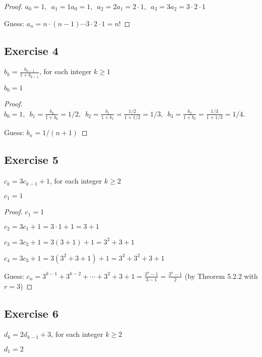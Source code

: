 \documentclass[14pt]{extarticle}
\newcommand{\dps}{\displaystyle}
\newcommand{\cy}{\color{cyan}}
\begin{document}
    \begin{proof}
        \(a_0 = 1, \,\,\, a_1 = 1a_0 = 1, \,\,\, a_2 = 2a_1 = 2 \cdot 1, \,\,\, a_3 = 3a_2 = 3 \cdot 2 \cdot 1\)

        Guess: \(a_n = n \cdot (n-1) \cdots 3 \cdot 2 \cdot 1 = n!\)

    \end{proof}

    \subsection{Exercise 4}
    \(b_k = \dps \frac{b_{k-1}}{1 + b_{k-1}}\), for each integer \(k \geq 1\)

    \(b_0 = 1\)

    \begin{proof}
        \(b_0 = 1, \,\,\, b_1 = \dps \frac{b_0}{1 + b_0} = 1/2, \,\,\, b_2 = \dps \frac{b_1}{1 + b_1} = \frac{1/2}{1+1/2}
        = 1/3, \,\,\, b_3 = \dps \frac{b_2}{1 + b_2} = \frac{1/3}{1+1/3} = 1/4.\)

        Guess: \(b_n = 1/(n+1)\)
    \end{proof}

    \subsection{Exercise 5}
    \(c_k = 3c_{k-1} + 1\), for each integer \(k \geq 2\)

    \(c_1 = 1\)

    \begin{proof}
        \(c_1 = 1\)

        \(c_2 = 3c_1 + 1 = 3 \cdot 1 + 1 = 3 + 1\)

        \(c_3 = 3c_2 + 1 = 3(3 + 1) + 1 = 3^2 + 3 + 1\)

        \(c_4 = 3c_3 + 1 = 3(3^2 + 3 + 1) + 1 = 3^3 + 3^2 + 3 + 1\)

        Guess: \(c_n = 3^{k-1} + 3^{k-2} + \cdots + 3^2 + 3 + 1 = \dps \frac{3^n - 1}{3 - 1} = \frac{3^n - 1}{2}\)
        {\cy (by Theorem 5.2.2 with $r = 3$)}
    \end{proof}

    \subsection{Exercise 6}
    \(d_k = 2d_{k-1} + 3\), for each integer \(k \geq 2\)

    \(d_1 = 2\)
\end{document}
